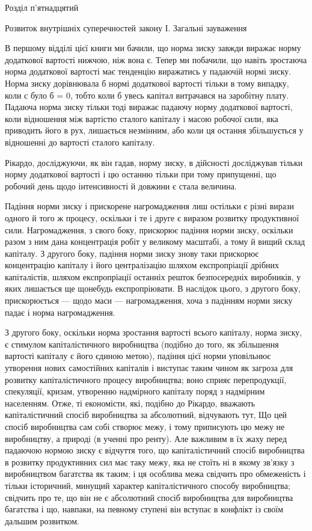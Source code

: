 Розділ п’ятнадцятий

Розвиток внутрішніх суперечностей закону
І. Загальні зауваження

В першому відділі цієї книги ми бачили, що норма зиску завжди виражає норму додаткової вартості
нижчою, ніж вона є. Тепер ми побачили, що навіть зростаюча норма додаткової вартості має тенденцію
виражатись у падаючій нормі зиску. Норма
зиску дорівнювала б нормі додаткової вартості тільки в тому випадку, коли с було б = 0, тобто коли б
увесь капітал витрачався на заробітну плату. Падаюча норма зиску тільки тоді виражає падаючу норму
додаткової вартості, коли відношення між вартістю сталого капіталу і масою робочої сили, яка
приводить його в рух, лишається незмінним, або коли ця остання збільшується у відношенні до вартості
сталого капіталу.

Рікардо, досліджуючи, як він гадав, норму зиску, в дійсності досліджував тільки норму додаткової
вартості і цю останню тільки при тому припущенні, що робочий день щодо інтенсивності й довжини є
стала величина.

Падіння норми зиску і прискорене нагромадження лиш остільки є різні вирази одного й того ж процесу,
оскільки і те і друге є виразом розвитку продуктивної сили. Нагромадження, з свого боку, прискорює
падіння норми зиску, оскільки разом з ним
дана концентрація робіт у великому масштабі, а тому й вищий склад капіталу. З другого боку, падіння
норми зиску знову таки прискорює концентрацію капіталу і його централізацію шляхом експропріації
дрібних капіталістів, шляхом експропріації
останніх решток безпосередніх виробників, у яких лишається ще щонебудь експропріювати. В наслідок
цього, з другого боку, прискорюється — щодо маси — нагромадження, хоча з падінням норми зиску падає
і норма нагромадження.

З другого боку, оскільки норма зростання вартості всього капіталу, норма зиску, є стимулом
капіталістичного виробництва (подібно до того, як збільшення вартості капіталу є його єдиною метою),
падіння цієї норми уповільнює утворення нових самостійних капіталів і виступає таким чином як
загроза для розвитку капіталістичного процесу виробництва; воно сприяє перепродукції, спекуляції,
кризам, утворенню надмірного капіталу поряд з надмірним населенням. Отже, ті економісти, які,
подібно до Рікардо, вважають капіталістичний спосіб виробництва за абсолютний, відчувають тут, Що
цей спосіб виробництва сам собі створює межу, і тому приписують цю межу не виробництву, а природі (в
ученні про ренту). Але важливим в їх жаху перед падаючою нормою зиску є відчуття того, що
капіталістичний спосіб виробництва в розвитку продуктивних сил має таку межу, яка не стоїть ні в
якому зв’язку з виробництвом багатства як таким;
і ця особлива межа свідчить про обмеженість і тільки
історичний, минущий характер капіталістичного способу виробництва;
свідчить про те, що він не є абсолютний спосіб виробництва
для виробництва багатства і що, навпаки, на певному
ступені він вступає в конфлікт із своїм дальшим розвитком.

